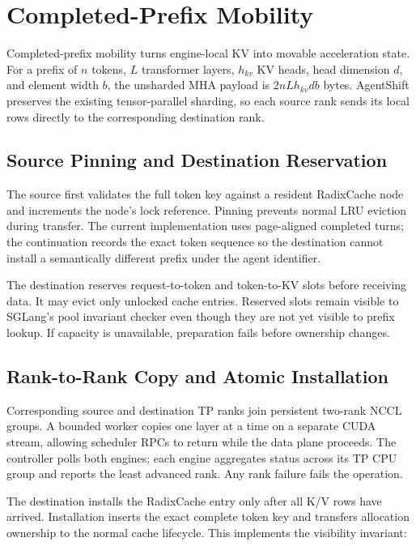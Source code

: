 \section{Completed-Prefix Mobility}\label{completed-prefix-mobility}

Completed-prefix mobility turns engine-local KV into movable acceleration state. For a prefix of \(n\) tokens, \(L\) transformer layers, \(h_{kv}\) KV heads, head dimension \(d\), and element width \(b\), the unsharded MHA payload is \(2nLh_{kv}db\) bytes. AgentShift preserves the existing tensor-parallel sharding, so each source rank sends its local rows directly to the corresponding destination rank.

\subsection{Source Pinning and Destination Reservation}\label{source-pinning-and-destination-reservation}

The source first validates the full token key against a resident RadixCache node and increments the node's lock reference. Pinning prevents normal LRU eviction during transfer. The current implementation uses page-aligned completed turns; the continuation records the exact token sequence so the destination cannot install a semantically different prefix under the agent identifier.

The destination reserves request-to-token and token-to-KV slots before receiving data. It may evict only unlocked cache entries. Reserved slots remain visible to SGLang's pool invariant checker even though they are not yet visible to prefix lookup. If capacity is unavailable, preparation fails before ownership changes.

\subsection{Rank-to-Rank Copy and Atomic Installation}\label{rank-to-rank-copy-and-atomic-installation}

Corresponding source and destination TP ranks join persistent two-rank NCCL groups. A bounded worker copies one layer at a time on a separate CUDA stream, allowing scheduler RPCs to return while the data plane proceeds. The controller polls both engines; each engine aggregates status across its TP CPU group and reports the least advanced rank. Any rank failure fails the operation.

The destination installs the RadixCache entry only after all K/V rows have arrived. Installation inserts the exact complete token key and transfers allocation ownership to the normal cache lifecycle. This implements the visibility invariant:

